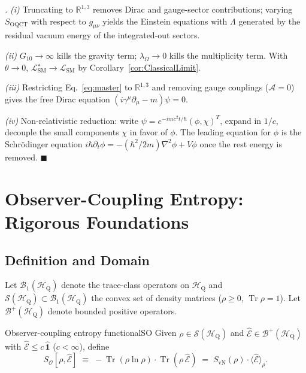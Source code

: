\documentclass[11pt,a4paper]{article}
\theoremstyle{myrmk}
\renewenvironment{proof}[1][\proofname]{%
  \par\noindent\textit{#1.}\enspace\ignorespaces}{\hfill$\blacksquare$\par\medskip}
\newcommand{\HH}{\mathcal{H}_{\mathrm{Q}}}
\newcommand{\Tr}{\operatorname{Tr}}
\newcommand{\Ehat}{\hat{\mathcal{E}}}
\newcommand{\Identity}{\hat{\mathbf{1}}}
\begin{document}
\begin{proof}
\emph{(i)} Truncating to $\mathbb{R}^{1,3}$ removes Dirac and gauge-sector contributions;
varying $S_{\mathrm{OQCT}}$ with respect to $g_{\mu\nu}$ yields the Einstein equations
with $\Lambda$ generated by the residual vacuum energy of the integrated-out sectors.

\emph{(ii)} $G_{10}\to\infty$ kills the gravity term; $\lambda_\Omega\to 0$ kills the
multiplicity term. With $\theta\to 0$, $\mathcal{L}_{\mathrm{SM}}^\star\to\mathcal{L}_{\mathrm{SM}}$
by Corollary~\ref{cor:ClassicalLimit}.

\emph{(iii)} Restricting Eq.~\eqref{eq:master} to $\mathbb{R}^{1,3}$ and removing gauge
couplings ($\mathcal{A}=0$) gives the free Dirac equation $(i\gamma^\mu\partial_\mu-m)\psi=0$.

\emph{(iv)} Non-relativistic reduction: write $\psi=e^{-imc^2t/\hbar}(\phi,\chi)^T$,
expand in $1/c$, decouple the small components $\chi$ in favor of $\phi$. The leading
equation for $\phi$ is the Schr\"odinger equation
$i\hbar\partial_t\phi=-(\hbar^2/2m)\nabla^2\phi+V\phi$ once the rest energy is removed.
\end{proof}

\section{Observer-Coupling Entropy: Rigorous Foundations}
\label{sec:entropy}

\subsection{Definition and Domain}

Let $\mathcal{B}_1(\HH)$ denote the trace-class operators on $\HH$ and
$\mathcal{S}(\HH)\subset\mathcal{B}_1(\HH)$ the convex set of density matrices
($\rho\geq 0$, $\Tr\rho=1$). Let $\mathcal{B}^+(\HH)$ denote bounded positive operators.

\begin{definition}{Observer-coupling entropy functional}{SO}
Given $\rho\in\mathcal{S}(\HH)$ and $\Ehat\in\mathcal{B}^+(\HH)$ with
$\Ehat\leq c\,\Identity$ ($c<\infty$), define
\begin{equation}
  S_{\mathcal{O}}[\rho,\Ehat] \;\equiv\; -\Tr(\rho\ln\rho)\cdot\Tr(\rho\,\Ehat)
  \;=\; S_{\mathrm{vN}}(\rho)\cdot\langle\Ehat\rangle_\rho.
  \label{eq:SO}
\end{equation}
\end{definition}
\end{document}

